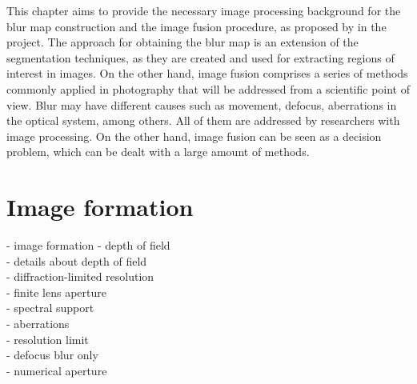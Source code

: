 
{\color{red}
This chapter aims to provide the necessary image processing background for the blur map construction and the image fusion procedure, as proposed by in the project. The approach for obtaining the blur map is an extension of the segmentation techniques, as they are created and used for extracting regions of interest in images. On the other hand, image fusion comprises a series of methods commonly applied in photography that will be addressed from a scientific point of view. Blur may have different causes such as movement, defocus, aberrations in the optical system, among others. All of them are addressed by researchers with image processing. On the other hand, image fusion can be seen as a decision problem, which can be dealt with a large amount of methods.}

\section{Image formation}
\noindent - image formation - depth of field\\
- details about depth of field\\
- diffraction-limited resolution\\
- finite lens aperture\\
- spectral support\\
- aberrations\\
- resolution limit\\
- defocus blur only\\
- numerical aperture\\



